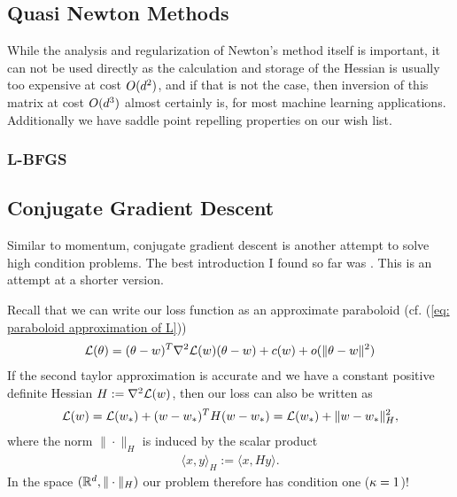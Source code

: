 \subsection{Quasi Newton Methods}

While the analysis and regularization of Newton's method itself is important,
it can not be used directly as the calculation and storage of the Hessian is
usually too expensive at cost \(O(d^2)\), and if that is not the case,
then inversion of this matrix at cost \(O(d^3)\) almost certainly is,
for most machine learning applications. Additionally we have saddle point
repelling properties on our wish list.



\subsubsection{L-BFGS}


\subsection{Conjugate Gradient Descent}

Similar to momentum, conjugate gradient descent is another attempt to solve
high condition problems. The best introduction I found so far was
\textcite{shewchukIntroductionConjugateGradient1994}. This is an attempt at a
shorter version. 

Recall that we can write
our loss function as an approximate paraboloid (cf. (\ref{eq: paraboloid
approximation of L}))
\begin{align*}
	\mathcal{L}(\theta)
	= (\theta-w)^T \nabla^2\mathcal{L}(w)(\theta-w)
	+ c(w) + o(\|\theta-w\|^2)
\end{align*}
If the second taylor approximation is accurate and we have a constant
positive definite Hessian \(H:=\nabla^2\mathcal{L}(w)\), then our loss can also
be written as
\begin{align*}
	\mathcal{L}(w) = \mathcal{L}(w_*) + 
	(w-w_*)^T H(w-w_*)
	= \mathcal{L}(w_*) + \|w-w_*\|_H^2,
\end{align*}
where the norm \(\|\cdot\|_H\) is induced by the scalar product
\begin{align*}
	\langle x, y \rangle_H := \langle x, Hy\rangle.
\end{align*}
In the space \((\mathbb{R}^d, \|\cdot\|_H)\) our problem therefore has condition one
(\(\kappa=1\))!

